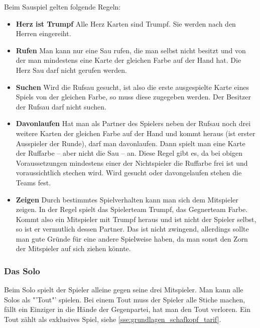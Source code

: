 \documentclass[
							a4paper, 
							11pt, 
							openany, 
							liststotoc,
							parskip=half, 
   							headings=normal
						]{scrreprt}
\begin{document}
{Beim Sauspiel gelten folgende Regeln:
\begin{itemize}
	\item \textbf{Herz ist Trumpf}\newline
Alle Herz Karten sind Trumpf. Sie werden nach den Herren eingereiht.	
	\item \textbf{Rufen}\newline
Man kann nur eine Sau rufen, die man selbst nicht besitzt und von der man mindestens eine Karte der gleichen Farbe auf der Hand hat. Die Herz Sau darf nicht gerufen werden.
	\item \textbf{Suchen}\newline
Wird die Rufsau gesucht, ist also die erste ausgespielte Karte eines Spiels von der gleichen Farbe, so muss diese zugegeben werden. Der Besitzer der Rufsau darf nicht suchen.
	\item \textbf{Davonlaufen}\newline
Hat man als Partner des Spielers neben der Rufsau noch drei weitere Karten der gleichen Farbe auf der Hand und kommt heraus (ist erster Ausspieler der Runde), darf man davonlaufen. Dann spielt man eine Karte der Ruffarbe -- aber nicht die Sau -- an.\newline
Diese Regel gibt es, da bei obigen Voraussetzungen mindestens einer der Nichtspieler die Ruffarbe frei ist und voraussichtlich stechen wird. Wird gesucht oder davongelaufen stehen die Teams fest.
	\item \textbf{Zeigen}\newline
Durch bestimmtes Spielverhalten kann man sich dem Mitspieler zeigen. In der Regel spielt das Spielerteam Trumpf, das Gegnerteam Farbe. Kommt also ein Mitspieler mit Trumpf heraus und ist nicht der Spieler selbst, so ist er vermutlich dessen Partner. Das ist nicht zwingend, allerdings sollte man gute Gründe für eine andere Spielweise haben, da man sonst den Zorn der Mitspieler auf sich ziehen könnte.
\end{itemize}
\cite[S.20f.]{merschbacher:schafkopf}

\clearpage

\subsubsection{Das Solo} \label{ssse:grundlagen_schafkopf_regeln_solo}
Beim Solo spielt der Spieler alleine gegen seine drei Mitspieler. Man kann alle Solos als "'Tout"' spielen. Bei einem Tout muss der Spieler alle Stiche machen, fällt ein Einziger in die Hände der Gegenpartei, hat man den Tout verloren.
Ein Tout zählt als exklusives Spiel, siehe \autoref{sse:grundlagen_schafkopf_tarif}.

}
\end{document}
